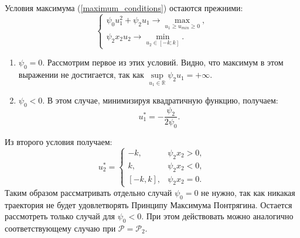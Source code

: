 \documentclass[10pt]{article}
\begin{document}
	Условия максимума (\ref{maximum_conditions}) остаются прежними:
	\[ \begin{cases}
		\psi_0 u_1^2 + \psi_2 u_1 \to \max\limits_{u_1 \ge u_{min} \ge 0},
		\\
		\psi_2 x_2 u_2 \to \min\limits_{u_2 \in [-k;k]}.
	\end{cases} \]
	
	\begin{enumerate}
		\item \( \psi_0  = 0 \).
		Рассмотрим первое из этих условий. Видно, что максимум в этом выражении не достигается, так как \( \sup\limits_{u_1 \in \mathbb{R}} \psi_2 u_1 = +\infty \).
		\item \( \psi_0 < 0 \).
		В этом случае, минимизируя квадратичную функцию, получаем:
		\[ u_1^* = -\frac{\psi_2}{2 \psi_0}.\]
	\end{enumerate}
	Из второго условия получаем:
	\[ u_2^* = \begin{cases} 
				-k  , & \psi_2 x_2 > 0 , 
				\\ 
				k  , & \psi_2 x_2 < 0 , 
				\\ 
				[-k, k]  , & \psi_2 x_2 = 0. 
			\end{cases} \]	 
	Таким образом рассматривать отдельно случай \( \psi_0 = 0 \) не нужно, так как никакая траектория не будет удовлетворять Принципу Максимума Понтрягина. Остается рассмотреть только случай для \( \psi_0 < 0 \). При этом действовать можно аналогично соответствующему случаю при \( \mathcal{P} = \mathcal{P}_2 \). 
	
\end{document}
